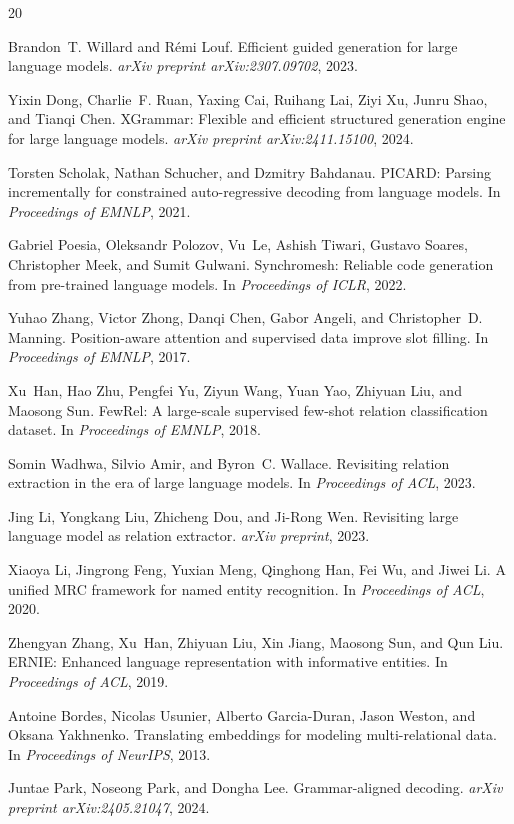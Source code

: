 \documentclass[11pt,a4paper]{article}
\begin{document}
\begin{thebibliography}{20}

Brandon~T. Willard and R{\'e}mi Louf.
Efficient guided generation for large language models.
{\em arXiv preprint arXiv:2307.09702}, 2023.

Yixin Dong, Charlie~F. Ruan, Yaxing Cai, Ruihang Lai, Ziyi Xu, Junru Shao, and Tianqi Chen.
XGrammar: Flexible and efficient structured generation engine for large language models.
{\em arXiv preprint arXiv:2411.15100}, 2024.

Torsten Scholak, Nathan Schucher, and Dzmitry Bahdanau.
PICARD: Parsing incrementally for constrained auto-regressive decoding from language models.
In {\em Proceedings of EMNLP}, 2021.

Gabriel Poesia, Oleksandr Polozov, Vu~Le, Ashish Tiwari, Gustavo Soares, Christopher Meek, and Sumit Gulwani.
Synchromesh: Reliable code generation from pre-trained language models.
In {\em Proceedings of ICLR}, 2022.

Yuhao Zhang, Victor Zhong, Danqi Chen, Gabor Angeli, and Christopher~D. Manning.
Position-aware attention and supervised data improve slot filling.
In {\em Proceedings of EMNLP}, 2017.

Xu~Han, Hao Zhu, Pengfei Yu, Ziyun Wang, Yuan Yao, Zhiyuan Liu, and Maosong Sun.
FewRel: A large-scale supervised few-shot relation classification dataset.
In {\em Proceedings of EMNLP}, 2018.

Somin Wadhwa, Silvio Amir, and Byron~C. Wallace.
Revisiting relation extraction in the era of large language models.
In {\em Proceedings of ACL}, 2023.

Jing Li, Yongkang Liu, Zhicheng Dou, and Ji-Rong Wen.
Revisiting large language model as relation extractor.
{\em arXiv preprint}, 2023.

Xiaoya Li, Jingrong Feng, Yuxian Meng, Qinghong Han, Fei Wu, and Jiwei Li.
A unified MRC framework for named entity recognition.
In {\em Proceedings of ACL}, 2020.

Zhengyan Zhang, Xu~Han, Zhiyuan Liu, Xin Jiang, Maosong Sun, and Qun Liu.
ERNIE: Enhanced language representation with informative entities.
In {\em Proceedings of ACL}, 2019.

Antoine Bordes, Nicolas Usunier, Alberto Garcia-Duran, Jason Weston, and Oksana Yakhnenko.
Translating embeddings for modeling multi-relational data.
In {\em Proceedings of NeurIPS}, 2013.

Juntae Park, Noseong Park, and Dongha Lee.
Grammar-aligned decoding.
{\em arXiv preprint arXiv:2405.21047}, 2024.

\end{thebibliography}
\end{document}
